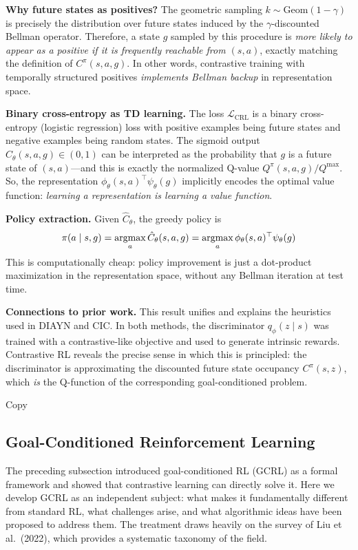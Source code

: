 \documentclass[11pt, letterpaper]{article}
\begin{document}
\begin{remark}
    \textbf{Why future states as positives?} The geometric sampling \(k \sim \text{Geom}(1 - \gamma)\) is precisely the distribution over future states induced by the \(\gamma\)-discounted Bellman operator. Therefore, a state \(g\) sampled by this procedure is \textit{more likely to appear as a positive if it is frequently reachable from \((s, a)\)}, exactly matching the definition of \(C^\pi(s, a, g)\). In other words, contrastive training with temporally structured positives \textit{implements Bellman backup} in representation space.
 
    \textbf{Binary cross-entropy as TD learning.} The loss \(\mathcal{L}_{\text{CRL}}\) is a binary cross-entropy (logistic regression) loss with positive examples being future states and negative examples being random states. The sigmoid output \(\hat{C}_\theta(s, a, g) \in (0,1)\) can be interpreted as the probability that \(g\) is a future state of \((s, a)\)---and this is exactly the normalized Q-value \(Q^\pi(s, a, g) / Q^{\max}\). So, the representation \(\phi_\theta(s, a)^\top \psi_\theta(g)\) implicitly encodes the optimal value function: \textit{learning a representation is learning a value function}.
 
    \textbf{Policy extraction.} Given \(\hat C_\theta\), the greedy policy is
    \[
        \pi(a \mid s, g) = \operatorname*{argmax}_a \hat{C}_\theta(s, a, g) = \operatorname*{argmax}_a \phi_\theta(s, a)^\top \psi_\theta(g)
    \]
    This is computationally cheap: policy improvement is just a dot-product maximization in the representation space, without any Bellman iteration at test time.
 
    \textbf{Connections to prior work.} This result unifies and explains the heuristics used in DIAYN and CIC. In both methods, the discriminator \(q_\phi(z \mid s)\) was trained with a contrastive-like objective and used to generate intrinsic rewards. Contrastive RL reveals the precise sense in which this is principled: the discriminator is approximating the discounted future state occupancy \(C^\pi(s, z)\), which \textit{is} the Q-function of the corresponding goal-conditioned problem.
\end{remark}


Copy

\subsection{Goal-Conditioned Reinforcement Learning}
 
The preceding subsection introduced goal-conditioned RL (GCRL) as a formal framework and showed that contrastive learning can directly solve it. Here we develop GCRL as an independent subject: what makes it fundamentally different from standard RL, what challenges arise, and what algorithmic ideas have been proposed to address them. The treatment draws heavily on the survey of Liu et al.\ (2022), which provides a systematic taxonomy of the field.
 
\end{document}
